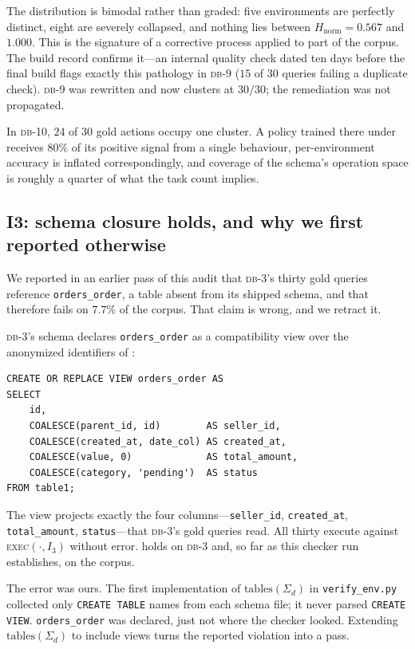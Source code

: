 \documentclass[11pt,letterpaper]{article}
\theoremstyle{definition}
\theoremstyle{plain}
\theoremstyle{remark}
\newcommand{\dbn}[1]{\textsc{db-#1}}
\newcommand{\code}[1]{\texttt{#1}}
\begin{document}
The distribution is bimodal rather than graded: five environments are perfectly distinct,
eight are severely collapsed, and nothing lies between $H_{\mathrm{norm}} = 0.567$ and
$1.000$. This is the signature of a corrective process applied to part of the corpus. The
build record confirms it---an internal quality check dated ten days before the final build
flags exactly this pathology in \dbn{9} ($15$ of $30$ queries failing a duplicate check).
\dbn{9} was rewritten and now clusters at $30/30$; the remediation was not propagated.

In \dbn{10}, $24$ of $30$ gold actions occupy one cluster. A policy trained there under
 receives $80\%$ of its positive signal from a single behaviour, per-environment
accuracy is inflated correspondingly, and coverage of the schema's operation space is roughly
a quarter of what the task count implies.

\subsection{I3: schema closure holds, and why we first reported otherwise}
\label{sec:i3}

We reported in an earlier pass of this audit that \dbn{3}'s thirty gold queries reference
\code{orders\_order}, a table absent from its shipped schema, and that  therefore
fails on $7.7\%$ of the corpus. That claim is wrong, and we retract it.

\dbn{3}'s schema declares \code{orders\_order} as a compatibility view over the anonymized
identifiers of :

\begin{lstlisting}
CREATE OR REPLACE VIEW orders_order AS
SELECT
    id,
    COALESCE(parent_id, id)        AS seller_id,
    COALESCE(created_at, date_col) AS created_at,
    COALESCE(value, 0)             AS total_amount,
    COALESCE(category, 'pending')  AS status
FROM table1;
\end{lstlisting}

The view projects exactly the four columns---\code{seller\_id}, \code{created\_at},
\code{total\_amount}, \code{status}---that \dbn{3}'s gold queries read. All thirty execute
against \textsc{exec}$(\cdot, I_3)$ without error.  holds on \dbn{3} and, so far as
this checker run establishes, on the corpus.

The error was ours. The first implementation of $\mathrm{tables}(\Sigma_d)$ in
\code{verify\_env.py} collected only \code{CREATE TABLE} names from each schema file; it never
parsed \code{CREATE VIEW}. \code{orders\_order} was declared, just not where the checker
looked. Extending $\mathrm{tables}(\Sigma_d)$ to include views turns the reported violation
into a pass.
\end{document}
